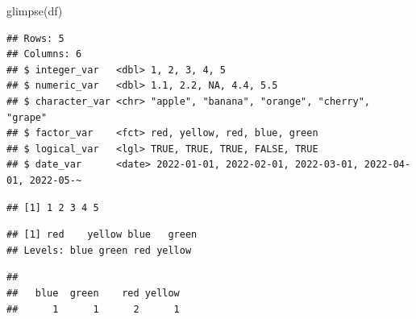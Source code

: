 \documentclass[
  12pt,
  oneside]{book}
\newenvironment{Shaded}{\begin{snugshade}}{\end{snugshade}}
\newcommand{\CommentTok}[1]{\textcolor[rgb]{0.56,0.35,0.01}{\textit{#1}}}
\newcommand{\FunctionTok}[1]{\textcolor[rgb]{0.00,0.00,0.00}{#1}}
\newcommand{\NormalTok}[1]{#1}
\newcommand{\SpecialCharTok}[1]{\textcolor[rgb]{0.00,0.00,0.00}{#1}}
\theoremstyle{definition}
\theoremstyle{definition}
\theoremstyle{definition}
\theoremstyle{definition}
\theoremstyle{remark}
\begin{document}
\begin{Shaded}
\begin{Highlighting}[]
\FunctionTok{glimpse}\NormalTok{(df)}
\end{Highlighting}
\end{Shaded}

\begin{verbatim}
## Rows: 5
## Columns: 6
## $ integer_var   <dbl> 1, 2, 3, 4, 5
## $ numeric_var   <dbl> 1.1, 2.2, NA, 4.4, 5.5
## $ character_var <chr> "apple", "banana", "orange", "cherry", "grape"
## $ factor_var    <fct> red, yellow, red, blue, green
## $ logical_var   <lgl> TRUE, TRUE, TRUE, FALSE, TRUE
## $ date_var      <date> 2022-01-01, 2022-02-01, 2022-03-01, 2022-04-01, 2022-05-~
\end{verbatim}

\begin{Shaded}
\end{Shaded}

\begin{verbatim}
## [1] 1 2 3 4 5
\end{verbatim}

\begin{Shaded}
\end{Shaded}

\begin{verbatim}
## [1] red    yellow blue   green 
## Levels: blue green red yellow
\end{verbatim}

\begin{Shaded}
\end{Shaded}

\begin{verbatim}
## 
##   blue  green    red yellow 
##      1      1      2      1
\end{verbatim}
\end{document}
